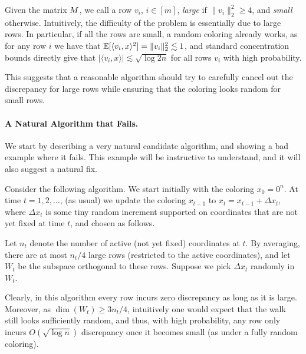 \smallskip

Given the matrix $M$, we call a row $v_i$, $i\in [m]$, {\em large} if $\|v_i\|^2_2  \geq 4$, and {\em small} otherwise.
Intuitively, the difficulty of the problem is essentially due to large rows. In particular, if all the rows are small, a random coloring already works,  as for any row $i$ we have that $\mathbb{E} [\langle v_i,x \rangle^2] =  \|v_i\|^2_2 \lesssim 1$, and standard concentration bounds directly give that $|\langle v_i, x\rangle | \lesssim 
\sqrt{\log 2n}$  for all rows $v_i$ with high probability.  

 This suggests that a reasonable algorithm should try to carefully cancel out the discrepancy for large rows while ensuring that the coloring looks random for small rows.
 

 
 \paragraph {A Natural Algorithm that Fails.} We start by describing a very natural candidate algorithm, and showing a bad  example where it fails. This example will be instructive to understand, and it will also suggest a natural fix.
 
Consider the following algorithm. We start initially with the coloring $x_0=0^n$. At time $t=1,2,\ldots$, (as usual) we update the coloring $x_{t-1}$ to $x_{t} = x_{t-1} + \Delta x_t$, where  $\Delta x_t$  is some tiny random increment %
supported on coordinates  that are not yet fixed at time $t$, and chosen as follows. 

Let $n_t$ denote the number of active (not yet fixed) coordinates at $t$.
By averaging, there are at most $n_t/4$ large rows (restricted to the active coordinates), and
let $W_t$ be the subspace orthogonal to these rows. Suppose we pick $\Delta x_t$ randomly in $W_t$. %

 Clearly, in this algorithm every row incurs zero discrepancy as long as it is large. Moreover, as $\dim(W_t)\geq 3n_t/4$, intuitively one would expect that the walk still looks sufficiently random, and thus, with high probability, any row only incurs $O(\sqrt{\log n})$ discrepancy once it becomes small (as under a fully random coloring). 


